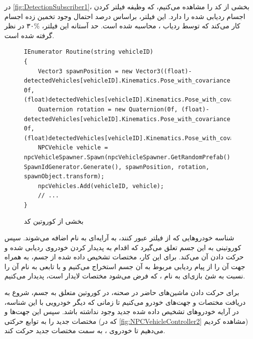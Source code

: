 در \cref{fig:DetectionSubscriber1}، بخشی از کد  را مشاهده می‌کنیم، که وظیفه فیلتر کردن اجسام ردیابی شده را دارد. این فیلتر، براساس درصد احتمال وجود تخمین زده اجسام کار می‌کند که توسط ردیاب ، محاسبه شده است. حد آستانه این فیلتر، \%۳۰ در نظر گرفته شده است.
\begin{figure}[h!]
    \centering
    \begin{latin}
        \begin{lstlisting}[style=codecs]
IEnumerator Routine(string vehicleID)
{
    Vector3 spawnPosition = new Vector3((float)-detectedVehicles[vehicleID].Kinematics.Pose_with_covariance.Pose.Position.Y, 0f, (float)detectedVehicles[vehicleID].Kinematics.Pose_with_covariance.Pose.Position.X);
    Quaternion rotation = new Quaternion(0f, (float)-detectedVehicles[vehicleID].Kinematics.Pose_with_covariance.Pose.Orientation.Z, 0f, (float)detectedVehicles[vehicleID].Kinematics.Pose_with_covariance.Pose.Orientation.W);
    NPCVehicle vehicle = npcVehicleSpawner.Spawn(npcVehicleSpawner.GetRandomPrefab(), SpawnIdGenerator.Generate(), spawnPosition, rotation, spawnObject.transform);
    npcVehicles.Add(vehicleID, vehicle);
    // ...
}
        \end{lstlisting}
    \end{latin}
    \caption{بخشی از کوروتین کد }
    \label{fig:DetectionSubscriber2}
\end{figure}
شناسه خودروهایی که از فیلتر عبور کنند، به آرایه‌ای به نام  اضافه می‌شوند. سپس کوروتینی به این جسم تعلق می‌گیرد که اقدام به پدیدار کردن خودروی ردیابی شده  و حرکت دادن آن می‌کند. برای این کار، مختصات تشخیص داده شده از جسم، به همراه جهت آن را از پیام ردیابی مربوط به آن جسم استخراج می‌کنیم و با تابعی به نام  آن را نسبت به شئ بازی‌ای به نام ، که فرض می‌شود مختصات لایدار است، پدیدار می‌کنیم.

برای حرکت دادن ماشین‌های حاضر در صحنه، در کوروتین متعلق به جسم، شروع به دریافت مختصات و جهت‌های خودرو می‌کنیم تا زمانی که دیگر خودرویی با این شناسه، در آرایه خودروهای تشخیص داده شده جدید وجود نداشته باشد. سپس این جهت‌ها و مختصات جدید را به توابع حرکتی (که در \cref{fig:NPCVehicleController2} مشاهده کردیم) می‌دهیم تا خودروی ، به سمت مختصات جدید حرکت کند.

